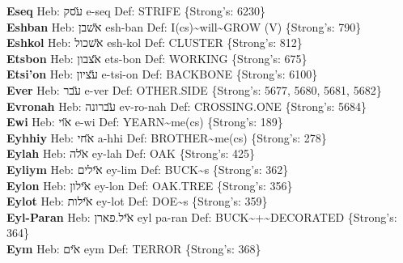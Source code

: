 {\textbf{Eseq} Heb: {\large\H עסק} e-seq Def: STRIFE \{Strong's: 6230\}\hfill{}\\

\textbf{Eshban} Heb: {\large\H אשבן} esh-ban Def: I(cs)\textasciitilde{}will\textasciitilde{}GROW (V) \{Strong's: 790\}\hfill{}\\

\textbf{Eshkol} Heb: {\large\H אשכול} esh-kol Def: CLUSTER \{Strong's: 812\}\hfill{}\\

\textbf{Etsbon} Heb: {\large\H אצבון} ets-bon Def: WORKING \{Strong's: 675\}\hfill{}\\

\textbf{Etsi'on} Heb: {\large\H עציון} e-tsi-on Def: BACKBONE \{Strong's: 6100\}\hfill{}\\

\textbf{Ever} Heb: {\large\H עבר} e-ver Def: OTHER.SIDE \{Strong's: 5677, 5680, 5681, 5682\}\hfill{}\\

\textbf{Evronah} Heb: {\large\H עברונה} ev-ro-nah Def: CROSSING.ONE \{Strong's: 5684\}\hfill{}\\

\textbf{Ewi} Heb: {\large\H אוי} e-wi Def: YEARN\textasciitilde{}me(cs) \{Strong's: 189\}\hfill{}\\

\textbf{Eyhhiy} Heb: {\large\H אחי} a-hhi Def: BROTHER\textasciitilde{}me(cs) \{Strong's: 278\}\hfill{}\\

\textbf{Eylah} Heb: {\large\H אלה} ey-lah Def: OAK \{Strong's: 425\}\hfill{}\\

\textbf{Eyliym} Heb: {\large\H אילים} ey-lim Def: BUCK\textasciitilde{}s \{Strong's: 362\}\hfill{}\\

\textbf{Eylon} Heb: {\large\H אילון} ey-lon Def: OAK.TREE \{Strong's: 356\}\hfill{}\\

\textbf{Eylot} Heb: {\large\H אילות} ey-lot Def: DOE\textasciitilde{}s \{Strong's: 359\}\hfill{}\\

\textbf{Eyl-Paran} Heb: {\large\H איל.פארן} eyl pa-ran Def: BUCK\textasciitilde{}+\textasciitilde{}DECORATED \{Strong's: 364\}\hfill{}\\

\textbf{Eym} Heb: {\large\H אים} eym Def: TERROR \{Strong's: 368\}\hfill{}\\

}
